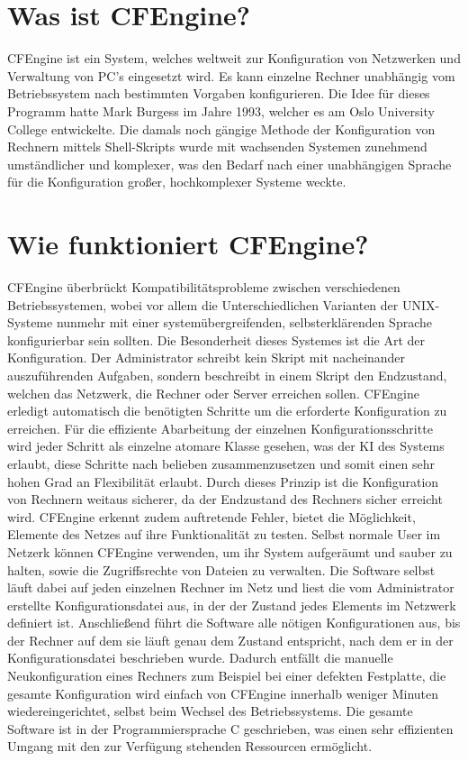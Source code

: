 
%
\section{Was ist CFEngine?}
CFEngine ist ein System, welches weltweit zur Konfiguration von Netzwerken und Verwaltung von PC's eingesetzt wird. Es kann einzelne Rechner unabhängig vom Betriebssystem nach bestimmten Vorgaben konfigurieren. Die Idee für dieses Programm hatte Mark Burgess im Jahre 1993, welcher es am Oslo University College entwickelte. Die damals noch gängige Methode der Konfiguration von Rechnern mittels Shell-Skripts wurde mit wachsenden Systemen zunehmend umständlicher und komplexer, was den Bedarf nach einer unabhängigen Sprache für die Konfiguration großer, hochkomplexer Systeme weckte.
\section{Wie funktioniert CFEngine?}
CFEngine überbrückt Kompatibilitätsprobleme zwischen verschiedenen Betriebssystemen, wobei vor allem die Unterschiedlichen Varianten der UNIX-Systeme nunmehr mit einer systemübergreifenden, selbsterklärenden Sprache konfigurierbar sein sollten. Die Besonderheit dieses Systemes ist die Art der Konfiguration. Der Administrator schreibt kein Skript mit nacheinander auszuführenden Aufgaben, sondern beschreibt in einem Skript den Endzustand, welchen das Netzwerk, die Rechner oder Server erreichen sollen. CFEngine erledigt automatisch die benötigten Schritte um die erforderte Konfiguration zu erreichen. Für die effiziente Abarbeitung der einzelnen Konfigurationsschritte wird jeder Schritt als einzelne atomare Klasse gesehen, was der KI des Systems erlaubt, diese Schritte nach belieben zusammenzusetzen und somit einen sehr hohen Grad an Flexibilität erlaubt.
Durch dieses Prinzip ist die Konfiguration von Rechnern weitaus sicherer, da der Endzustand des Rechners sicher erreicht wird. CFEngine erkennt zudem auftretende Fehler, bietet die Möglichkeit, Elemente des Netzes auf ihre Funktionalität zu testen. Selbst normale User im Netzerk können CFEngine verwenden, um ihr System aufgeräumt und sauber zu halten, sowie die Zugriffsrechte von Dateien zu verwalten.
Die Software selbst läuft dabei auf jeden einzelnen Rechner im Netz und liest die vom Administrator erstellte Konfigurationsdatei aus, in der der Zustand jedes Elements im Netzwerk definiert ist. Anschließend führt die Software alle nötigen Konfigurationen aus, bis der Rechner auf dem sie läuft genau dem Zustand entspricht, nach dem er in der Konfigurationsdatei beschrieben wurde. Dadurch entfällt die manuelle Neukonfiguration eines Rechners zum Beispiel bei einer defekten Festplatte, die gesamte Konfiguration wird einfach von CFEngine innerhalb weniger Minuten wiedereingerichtet, selbst beim Wechsel des Betriebssystems.
Die gesamte Software ist in der Programmiersprache C geschrieben, was einen sehr effizienten Umgang mit den zur Verfügung stehenden Ressourcen ermöglicht.
